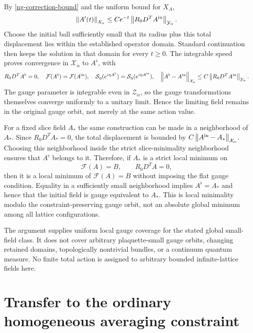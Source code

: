 \documentclass[11pt]{article}
\theoremstyle{remark}
\newcommand{\norm}[1]{\left\|#1\right\|}
\begin{document}
By \eqref{ng-correction-bound} and the uniform bound for $X_A$,
\begin{equation}\label{ng-flow-speed}
 \norm{A'(t)}_{\mathcal X_\alpha}
    \le Ce^{-t}\norm{R_0D^TA^{\rm in}}_{\mathcal Y_\alpha}.
\end{equation}
Choose the initial ball sufficiently small that its radius plus
this total displacement lies within the established operator
domain. Standard continuation then keeps the solution in that
domain for every $t\ge0$. The integrable speed proves convergence
in $\mathcal X_\alpha$ to $A^\flat$, with
\begin{equation}\label{ng-flow-limit}
 R_0D^TA^\flat=0,\quad
 \mathcal F(A^\flat)=\mathcal F(A^{\rm in}),\quad
 \mathcal S_\eta(e^{i\eta A^\flat})
          =\mathcal S_\eta(e^{i\eta A^{\rm in}}),\quad
 \norm{A^\flat-A^{\rm in}}_{\mathcal X_\alpha}
       \le C\norm{R_0D^TA^{\rm in}}_{\mathcal Y_\alpha}.
\end{equation}
The gauge parameter is integrable even in $\mathcal Z_\alpha$,
so the gauge transformations themselves converge uniformly to a
unitary limit. Hence the limiting field remains in the original
gauge orbit, not merely at the same action value.

For a fixed slice field $A_*$ the same construction can be made
in a neighborhood of $A_*$. Since $R_0D^TA_*=0$,
the total displacement is bounded by
$C\norm{A^{\rm in}-A_*}_{\mathcal X_\alpha}$.
Choosing this neighborhood inside the strict slice-minimality
neighborhood ensures that $A^\flat$ belongs to it. Therefore,
if $A_*$ is a strict local minimum on
\[
 \mathcal F(A)=B,\qquad R_0D^TA=0,
\]
then it is a local minimum of $\mathcal F(A)=B$ without imposing
the flat gauge condition. Equality in a sufficiently small
neighborhood implies $A^\flat=A_*$ and hence that the initial
field is gauge equivalent to $A_*$. This is local minimality
modulo the constraint-preserving gauge orbit, not an absolute
global minimum among all lattice configurations.

The argument supplies uniform local gauge coverage for the stated
global small-field class. It does not cover arbitrary plaquette-small
gauge orbits, changing retained domains, topologically nontrivial
bundles, or a continuum quantum measure. No finite total action is
assigned to arbitrary bounded infinite-lattice fields here.

\section{Transfer to the ordinary homogeneous averaging constraint}
\label{ot-section}
\end{document}
